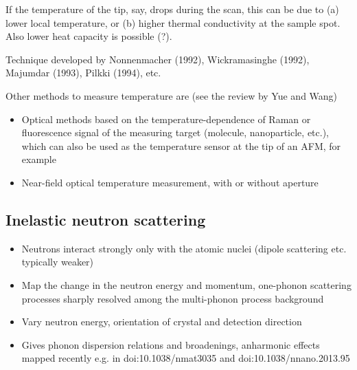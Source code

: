 If the temperature of the tip, say, drops during the scan, this can be due to (a) lower local temperature, or (b) higher thermal conductivity at the sample spot. Also lower heat capacity is possible (?). 

Technique developed by Nonnenmacher (1992), Wickramasinghe (1992), Majumdar (1993), Pilkki (1994), etc.

Other methods to measure temperature are (see the review by Yue and Wang)
\begin{itemize}
 \item Optical methods based on the temperature-dependence of Raman or fluorescence signal of the measuring target (molecule, nanoparticle, etc.), which can also be used as the temperature sensor at the tip of an AFM, for example
 \item Near-field optical temperature measurement, with or without aperture
\end{itemize}

\subsection{Inelastic neutron scattering}
 \begin{itemize}
  \item Neutrons interact strongly only with the atomic nuclei (dipole scattering etc. typically weaker)
  \item Map the change in the neutron energy and momentum, one-phonon scattering processes sharply resolved among the multi-phonon process background
  \item Vary neutron energy, orientation of crystal and detection direction
  \item Gives phonon dispersion relations and broadenings, anharmonic effects mapped recently e.g. in doi:10.1038/nmat3035 and doi:10.1038/nnano.2013.95
 \end{itemize}
\fi
